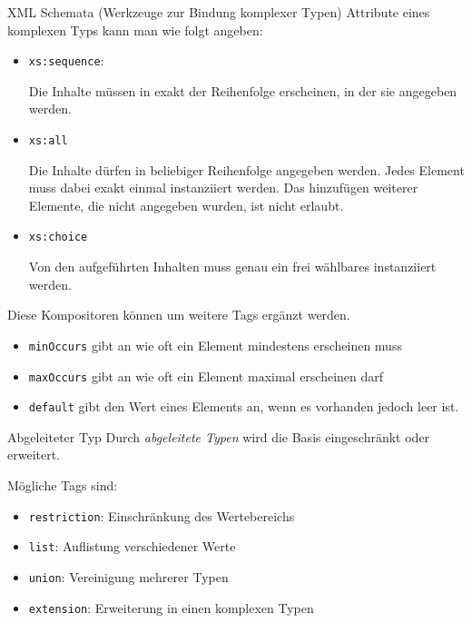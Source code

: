 \begin{bonus}{XML Schemata (Werkzeuge zur Bindung komplexer Typen)}
    Attribute eines komplexen Typs kann man wie folgt angeben:

    \begin{itemize}
        \item \texttt{xs:sequence}:

              Die Inhalte müssen in exakt der Reihenfolge erscheinen, in der sie angegeben werden.
        \item \texttt{xs:all}

              Die Inhalte dürfen in beliebiger Reihenfolge angegeben werden.
              Jedes Element muss dabei exakt einmal instanziiert werden.
              Das hinzufügen weiterer Elemente, die nicht angegeben wurden, ist nicht erlaubt.
        \item \texttt{xs:choice}

              Von den aufgeführten Inhalten muss genau ein frei wählbares instanziiert werden.
    \end{itemize}

    Diese Kompositoren können um weitere Tags ergänzt werden.

    \begin{itemize}
        \item \texttt{minOccurs} gibt an wie oft ein Element mindestens erscheinen muss
        \item \texttt{maxOccurs} gibt an wie oft ein Element maximal erscheinen darf
        \item \texttt{default} gibt den Wert eines Elements an, wenn es vorhanden jedoch leer ist.
    \end{itemize}
\end{bonus}

\begin{bonus}{Abgeleiteter Typ}
    Durch \emph{abgeleitete Typen} wird die Basis eingeschränkt oder erweitert.

    Mögliche Tags sind:

    \begin{itemize}
        \item \texttt{restriction}: Einschränkung des Wertebereichs
        \item \texttt{list}: Auflistung verschiedener Werte
        \item \texttt{union}: Vereinigung mehrerer Typen
        \item \texttt{extension}: Erweiterung in einen komplexen Typen
    \end{itemize}
\end{bonus}

